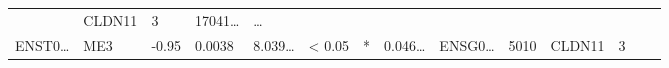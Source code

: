 \documentclass[
]{article}
\begin{document}
\begin{longtable}[]{@{}llllllllllllll@{}}
\begin{minipage}[t]{0.05\columnwidth}
\end{minipage} & \begin{minipage}[t]{0.05\columnwidth}\raggedright
CLDN11\strut
\end{minipage} & \begin{minipage}[t]{0.05\columnwidth}\raggedright
3\strut
\end{minipage} & \begin{minipage}[t]{0.05\columnwidth}\raggedright
17041\ldots{}\strut
\end{minipage} & \begin{minipage}[t]{0.02\columnwidth}\raggedright
\ldots{}\strut
\end{minipage}\tabularnewline
\begin{minipage}[t]{0.05\columnwidth}\raggedright
ENST0\ldots{}\strut
\end{minipage} & \begin{minipage}[t]{0.04\columnwidth}\raggedright
ME3\strut
\end{minipage} & \begin{minipage}[t]{0.04\columnwidth}\raggedright
-0.95\strut
\end{minipage} & \begin{minipage}[t]{0.04\columnwidth}\raggedright
0.0038\strut
\end{minipage} & \begin{minipage}[t]{0.05\columnwidth}\raggedright
8.039\ldots{}\strut
\end{minipage} & \begin{minipage}[t]{0.05\columnwidth}\raggedright
\textless{} 0.05\strut
\end{minipage} & \begin{minipage}[t]{0.03\columnwidth}\raggedright
*\strut
\end{minipage} & \begin{minipage}[t]{0.05\columnwidth}\raggedright
0.046\ldots{}\strut
\end{minipage} & \begin{minipage}[t]{0.05\columnwidth}\raggedright
ENSG0\ldots{}\strut
\end{minipage} & \begin{minipage}[t]{0.05\columnwidth}\raggedright
5010\strut
\end{minipage} & \begin{minipage}[t]{0.05\columnwidth}\raggedright
CLDN11\strut
\end{minipage} & \begin{minipage}[t]{0.05\columnwidth}\raggedright
3\strut
\end{minipage} & \begin{minipage}[t]{0.05\columnwidth}\raggedright

\end{minipage}
\end{longtable}
\end{document}
